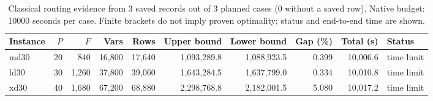 \begin{table}[htbp]
\centering\scriptsize
\setlength{\tabcolsep}{3pt}
\caption{Classical routing evidence from 3 saved records out of 3 planned cases (0 without a saved row). Native budget: 10000 seconds per case. Finite brackets do not imply proven optimality; status and end-to-end time are shown.}
\label{tab:khaled_30day_classical}
\begin{tabular}{lrrrrrrrrl}
\toprule
Instance & $P$ & $F$ & Vars & Rows & Upper bound & Lower bound & Gap (\%) & Total (s) & Status \\
\midrule
md30 & 20 & 840 & 16,800 & 17,640 & 1,093,289.8 & 1,088,923.5 & 0.399 & 10,006.6 & time limit \\
ld30 & 30 & 1,260 & 37,800 & 39,060 & 1,643,284.5 & 1,637,799.0 & 0.334 & 10,010.8 & time limit \\
xd30 & 40 & 1,680 & 67,200 & 68,880 & 2,298,768.8 & 2,182,001.5 & 5.080 & 10,017.2 & time limit \\
\bottomrule
\end{tabular}
\end{table}
